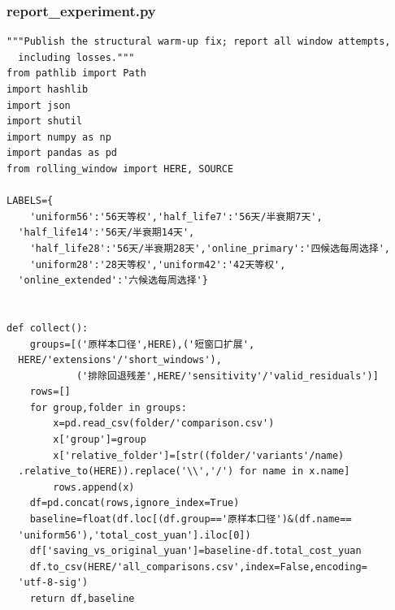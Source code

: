 \subsubsection*{report\_experiment.py}
\begin{verbatim}
"""Publish the structural warm-up fix; report all window attempts,
  including losses."""
from pathlib import Path
import hashlib
import json
import shutil
import numpy as np
import pandas as pd
from rolling_window import HERE, SOURCE

LABELS={
    'uniform56':'56天等权','half_life7':'56天/半衰期7天',
  'half_life14':'56天/半衰期14天',
    'half_life28':'56天/半衰期28天','online_primary':'四候选每周选择',
    'uniform28':'28天等权','uniform42':'42天等权',
  'online_extended':'六候选每周选择'}


def collect():
    groups=[('原样本口径',HERE),('短窗口扩展',
  HERE/'extensions'/'short_windows'),
            ('排除回退残差',HERE/'sensitivity'/'valid_residuals')]
    rows=[]
    for group,folder in groups:
        x=pd.read_csv(folder/'comparison.csv')
        x['group']=group
        x['relative_folder']=[str((folder/'variants'/name)
  .relative_to(HERE)).replace('\\','/') for name in x.name]
        rows.append(x)
    df=pd.concat(rows,ignore_index=True)
    baseline=float(df.loc[(df.group=='原样本口径')&(df.name==
  'uniform56'),'total_cost_yuan'].iloc[0])
    df['saving_vs_original_yuan']=baseline-df.total_cost_yuan
    df.to_csv(HERE/'all_comparisons.csv',index=False,encoding=
  'utf-8-sig')
    return df,baseline



\end{verbatim}
